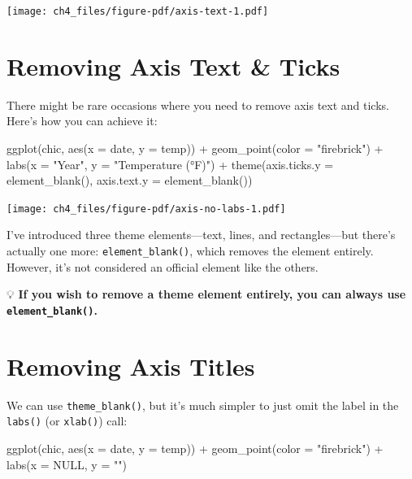\documentclass[
  letterpaper,
  DIV=11,
  numbers=noendperiod]{scrreprt}
\newenvironment{Shaded}{\begin{snugshade}}{\end{snugshade}}
\newcommand{\AttributeTok}[1]{\textcolor[rgb]{0.40,0.45,0.13}{#1}}
\newcommand{\ConstantTok}[1]{\textcolor[rgb]{0.56,0.35,0.01}{#1}}
\newcommand{\FunctionTok}[1]{\textcolor[rgb]{0.28,0.35,0.67}{#1}}
\newcommand{\NormalTok}[1]{\textcolor[rgb]{0.00,0.23,0.31}{#1}}
\newcommand{\SpecialCharTok}[1]{\textcolor[rgb]{0.37,0.37,0.37}{#1}}
\newcommand{\StringTok}[1]{\textcolor[rgb]{0.13,0.47,0.30}{#1}}
\begin{document}
\texttt{[image: ch4\_files/figure-pdf/axis-text-1.pdf]}

\section{Removing Axis Text \& Ticks}\label{removing-axis-text-ticks}

There might be rare occasions where you need to remove axis text and
ticks. Here's how you can achieve it:

\begin{Shaded}
\begin{Highlighting}[]
\FunctionTok{ggplot}\NormalTok{(chic, }\FunctionTok{aes}\NormalTok{(}\AttributeTok{x =}\NormalTok{ date, }\AttributeTok{y =}\NormalTok{ temp)) }\SpecialCharTok{+}
  \FunctionTok{geom\_point}\NormalTok{(}\AttributeTok{color =} \StringTok{"firebrick"}\NormalTok{) }\SpecialCharTok{+}
  \FunctionTok{labs}\NormalTok{(}\AttributeTok{x =} \StringTok{"Year"}\NormalTok{, }\AttributeTok{y =} \StringTok{"Temperature (°F)"}\NormalTok{) }\SpecialCharTok{+}
  \FunctionTok{theme}\NormalTok{(}\AttributeTok{axis.ticks.y =} \FunctionTok{element\_blank}\NormalTok{(),}
        \AttributeTok{axis.text.y =} \FunctionTok{element\_blank}\NormalTok{())}
\end{Highlighting}
\end{Shaded}

\texttt{[image: ch4\_files/figure-pdf/axis-no-labs-1.pdf]}

I've introduced three theme elements---text, lines, and rectangles---but
there's actually one more: \texttt{element\_blank()}, which removes the
element entirely. However, it's not considered an official element like
the others.

💡 \textbf{If you wish to remove a theme element entirely, you can
always use \texttt{element\_blank()}.}

\section{Removing Axis Titles}\label{removing-axis-titles}

We can use \texttt{theme\_blank()}, but it's much simpler to just omit
the label in the \texttt{labs()} (or \texttt{xlab()}) call:

\begin{Shaded}
\begin{Highlighting}[]
\FunctionTok{ggplot}\NormalTok{(chic, }\FunctionTok{aes}\NormalTok{(}\AttributeTok{x =}\NormalTok{ date, }\AttributeTok{y =}\NormalTok{ temp)) }\SpecialCharTok{+}
  \FunctionTok{geom\_point}\NormalTok{(}\AttributeTok{color =} \StringTok{"firebrick"}\NormalTok{) }\SpecialCharTok{+}
  \FunctionTok{labs}\NormalTok{(}\AttributeTok{x =} \ConstantTok{NULL}\NormalTok{, }\AttributeTok{y =} \StringTok{""}\NormalTok{)}
\end{Highlighting}
\end{Shaded}
\end{document}
